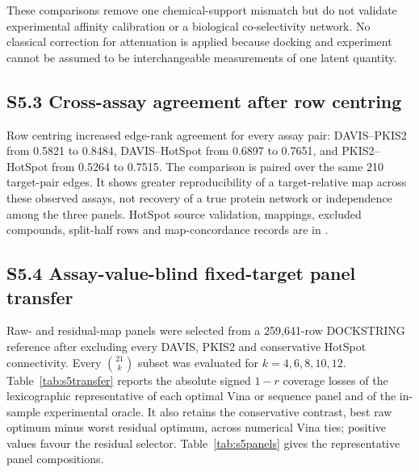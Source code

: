 \documentclass[11pt]{article}
\begin{document}
These comparisons remove one chemical-support mismatch but do not validate
experimental affinity calibration or a biological co-selectivity network. No
classical correction for attenuation is applied because docking and experiment
cannot be assumed to be interchangeable measurements of one latent quantity.

\subsection*{S5.3 Cross-assay agreement after row centring}

Row centring increased edge-rank agreement for every assay pair: DAVIS--PKIS2
from 0.5821 to 0.8484, DAVIS--HotSpot from 0.6897 to 0.7651, and
PKIS2--HotSpot from 0.5264 to 0.7515. The comparison is paired over the same 210
target-pair edges. It shows greater reproducibility of a target-relative map
across these observed assays, not recovery of a true protein network or
independence among the three panels. HotSpot source validation, mappings,
excluded compounds, split-half rows and map-concordance records are in
.

\subsection*{S5.4 Assay-value-blind fixed-target panel transfer}

Raw- and residual-map panels were selected from a 259,641-row DOCKSTRING
reference after excluding every DAVIS, PKIS2 and conservative HotSpot
connectivity. Every $\binom{21}{k}$ subset was evaluated for
$k=4,6,8,10,12$. Table~\ref{tab:s5transfer} reports the absolute signed
$1-r$ coverage losses of the lexicographic representative of each optimal
Vina or sequence panel and of the in-sample experimental oracle. It also
retains the conservative contrast, best raw optimum minus worst residual
optimum, across numerical Vina ties; positive values favour the residual
selector. Table~\ref{tab:s5panels} gives the representative panel compositions.
\end{document}
